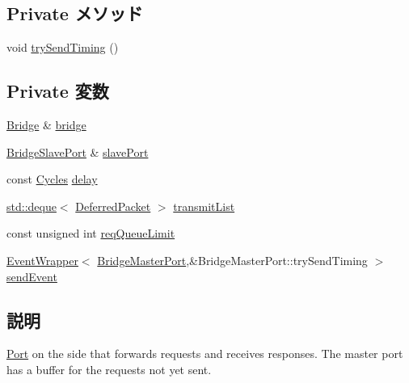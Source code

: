 \subsection*{Private メソッド}
\begin{DoxyCompactItemize}
\item 
void \hyperlink{classBridge_1_1BridgeMasterPort_a391c414b53eb45782e37bc539608e477}{trySendTiming} ()
\end{DoxyCompactItemize}
\subsection*{Private 変数}
\begin{DoxyCompactItemize}
\item 
\hyperlink{classBridge_1_1Bridge}{Bridge} \& \hyperlink{classBridge_1_1BridgeMasterPort_a6d3b24e49ac986064571195ab9905136}{bridge}
\item 
\hyperlink{classBridge_1_1BridgeSlavePort}{BridgeSlavePort} \& \hyperlink{classBridge_1_1BridgeMasterPort_a1e08ec2f17b79c544fef06a37d6b4ba3}{slavePort}
\item 
const \hyperlink{classCycles}{Cycles} \hyperlink{classBridge_1_1BridgeMasterPort_a153dd7cdfa9816427cbbe84dce923c8d}{delay}
\item 
\hyperlink{classstd_1_1deque}{std::deque}$<$ \hyperlink{classBridge_1_1DeferredPacket}{DeferredPacket} $>$ \hyperlink{classBridge_1_1BridgeMasterPort_a640fbfa2436c06d6f64608f76261e6e5}{transmitList}
\item 
const unsigned int \hyperlink{classBridge_1_1BridgeMasterPort_abe7df187a5de0c89447640be0c8d6f87}{reqQueueLimit}
\item 
\hyperlink{classEventWrapper}{EventWrapper}$<$ \hyperlink{classBridge_1_1BridgeMasterPort}{BridgeMasterPort},\&BridgeMasterPort::trySendTiming $>$ \hyperlink{classBridge_1_1BridgeMasterPort_ac65e9e742d994553fd80b8b38c2bd5dd}{sendEvent}
\end{DoxyCompactItemize}


\subsection{説明}
\hyperlink{classPort}{Port} on the side that forwards requests and receives responses. The master port has a buffer for the requests not yet sent. 

